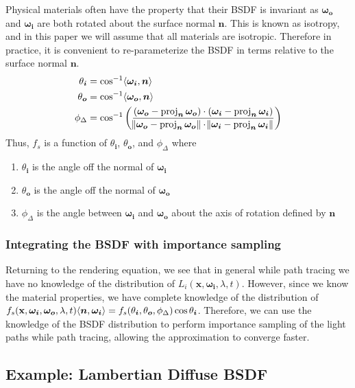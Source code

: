 \documentclass[12pt]{article}
\DeclarePairedDelimiter\ip{\langle }{\rangle}
\DeclareMathOperator{\proj}{proj}
\begin{document}
Physical materials often have the property that their BSDF is invariant as \(\bm{\omega_o}\) and \(\bm{\omega_i}\) are both rotated about the surface normal \(\bm n\).
This is known as isotropy, and in this paper we will assume that all materials are isotropic.
Therefore in practice, it is convenient to re-parameterize the BSDF in terms relative to the surface normal \(\bm n\).
\begin{align*}
  \theta_{\bm i} &= \cos^{-1} \ip{\bm{\omega_i}, \bm n}\\
  \theta_{\bm o} &= \cos^{-1} \ip{\bm{\omega_o}, \bm n}\\
  \phi_\Delta &= \cos^{-1}\del{\frac{\del{\bm{\omega_o} - \proj_{\bm n} \bm{\omega_o}} \cdot \del{\bm{\omega_i} - \proj_{\bm n} \bm{\omega_i}}}{\norm{\bm{\omega_o} - \proj_{\bm n} \bm{\omega_o}} \cdot \norm{\bm{\omega_i} - \proj_{\bm n} \bm{\omega_i}}}}
\end{align*}
Thus, \(f_s\) is a function of \(\theta_{\bm i}\), \(\theta_{\bm o}\), and \(\phi_\Delta\) where
\begin{enumerate}
\item \(\theta_{\bm i}\) is the angle off the normal of \(\bm{\omega_i}\)
\item \(\theta_{\bm o}\) is the angle off the normal of \(\bm{\omega_o}\)
\item \(\phi_\Delta\) is the angle between \(\bm{\omega_i}\) and \(\bm{\omega_o}\) about the axis of rotation defined by \(\bm n\)
\end{enumerate}

\subsubsection{Integrating the BSDF with importance sampling}
Returning to the rendering equation, we see that in general while path tracing we have no knowledge of the distribution of \(L_i(\mathbf x, \bm{\omega_i}, \lambda, t)\).
However, since we know the material properties, we have complete knowledge of the distribution of \(f_s(\mathbf x, \bm{\omega_i}, \bm{\omega_o}, \lambda, t)\ip{\bm n, \bm{\omega_i}} = f_s(\theta_{\bm i}, \theta_{\bm o}, \phi_\Delta)\cos \theta_{\bm i}\).
Therefore, we can use the knowledge of the BSDF distribution to perform importance sampling of the light paths while path tracing, allowing the approximation to converge faster.

\subsection{Example: Lambertian Diffuse BSDF}
\end{document}
